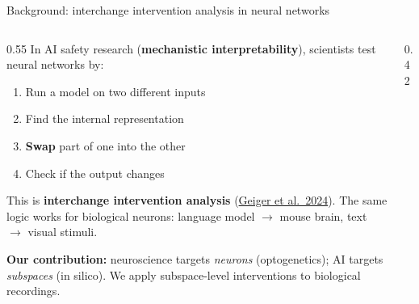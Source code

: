 \documentclass[aspectratio=169,11pt]{beamer}
\begin{document}
\begin{frame}{Background: interchange intervention analysis in neural networks}
\begin{columns}[T]
\begin{column}{0.55\textwidth}
{\small In AI safety research (\textbf{mechanistic interpretability}), scientists test neural networks by:}

\begin{enumerate}\setlength\itemsep{0pt}
  \item {\small Run a model on two different inputs}
  \item {\small Find the internal representation}
  \item {\small \textbf{Swap} part of one into the other}
  \item {\small Check if the output changes}
\end{enumerate}

\vspace{0.1em}
{\small This is \textbf{interchange intervention analysis} (\href{https://arxiv.org/abs/2303.02536}{Geiger et al.\ 2024}). The same logic works for biological neurons: language model $\to$ mouse brain, text $\to$ visual stimuli.}

\vspace{0.2em}
{\scriptsize \textbf{Our contribution:} neuroscience targets \emph{neurons} (optogenetics); AI targets \emph{subspaces} (in silico). We apply subspace-level interventions to biological recordings.}
\end{column}
\begin{column}{0.42\textwidth}
\centering
{}
\end{column}
\end{columns}
\end{frame}
\end{document}
